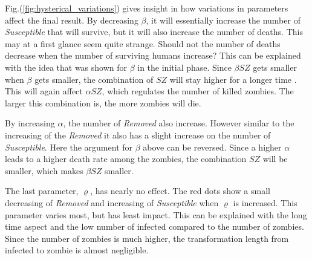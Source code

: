 \documentclass[%
twoside,                 %
final,                   %
chapterprefix=true,      %
open=right               %
10pt]{book}
\begin{document}
Fig.(\ref{fig:hysterical_variations}) gives insight in how variations in parameters affect the final result. By decreasing $\beta$, it will essentially increase the number of \emph{Susceptible} that will survive, but it will also increase the number of deaths. This may at a first glance seem quite strange. Should not the number of deaths decrease when the number of surviving humans increase? This can be explained with the idea that was shown for $\beta$ in the initial phase. Since $\beta SZ$ gets smaller when $\beta$ gets smaller, the combination of $SZ$ will stay higher for a longer time . This will again affect $\alpha SZ$, which regulates the number of killed zombies. The larger this combination is, the more zombies will die. 


\vspace{3mm}




\vspace{3mm}


By increasing $\alpha$, the number of \emph{Removed} also increase. However similar to the increasing of the \emph{Removed} it also has a slight increase on the number of \emph{Susceptible}. Here the argument for $\beta$ above can be reversed. Since a higher $\alpha$ leads to a higher death rate among the zombies, the combination $SZ$ will be smaller, which makes $\beta SZ$ smaller.


\vspace{3mm}




\vspace{3mm}


The last parameter, $\varrho$, has nearly no effect. The red dots show a small decreasing of \emph{Removed} and increasing of \emph{Susceptible}  when $\varrho$ is increased. This parameter varies most, but has least impact. This can be explained with the long time aspect and the low number of infected compared to the number of zombies. Since the number of zombies is much higher, the transformation length from infected to zombie is almost negligible.  
\end{document}
